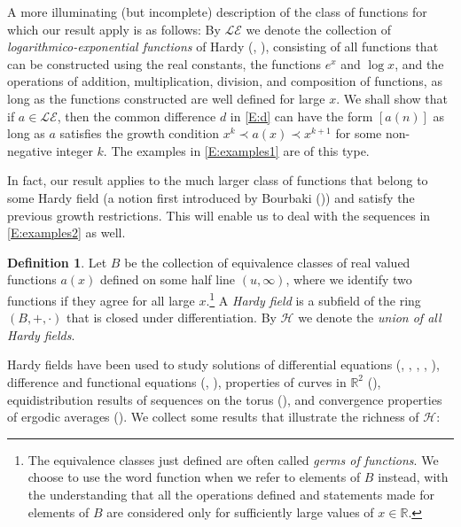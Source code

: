 \documentclass[11pt]{amsart}
\newcommand{\LE}{\mathcal{LE}}
\renewcommand{\H}{\mathcal{H}}
\newcommand{\R}{\mathbb{R}}
\theoremstyle{plain}
\theoremstyle{definition}
\newtheorem{definition}[theorem]{Definition}
\theoremstyle{remark}
\begin{document}


A more illuminating (but incomplete) description of the class of
functions for which our result apply is as follows: By $\LE$ we denote
the collection of \emph{logarithmico-exponential functions} of Hardy
(\cite{Ha1}, \cite{Ha2}), consisting of all functions that can be
constructed using the real constants, the functions $e^x$ and
$\log{x}$, and the operations of addition, multiplication, division,
and composition of functions, as long as the functions constructed are
well defined for large $x$.  We shall show that if $a\in \LE$, then the
common difference $d$ in \eqref{E:d} can have the form $[a(n)]$  as long as $a$ satisfies
the growth condition $x^k
\prec a(x) \prec x^{k+1}$ for some non-negative integer $k$. The
examples in \eqref{E:examples1} are of this type.

In fact, our result applies to the much larger class of functions that
belong to some Hardy field (a notion first introduced by Bourbaki
(\cite{Bou})) and satisfy the previous growth restrictions. This will
enable us to deal with the sequences in \eqref{E:examples2} as well.
\begin{definition}
  Let $B$ be the collection of equivalence classes of real valued
  functions $a(x)$ defined on some half line $(u,\infty)$, where we
  identify two functions if they agree for all large $x$.\footnote{The
    equivalence classes just defined are often called \emph{germs of
      functions}. We choose to use the word function when we refer to
    elements of $B$ instead, with the understanding that all the
    operations defined and statements made for elements of $B$ are
    considered only for sufficiently large values of $x\in \R$.}  A
  \emph{Hardy field} is a subfield of the ring $(B,+,\cdot)$ that is
  closed under differentiation. By $\H$ we denote the \emph{union of all
  Hardy fields}.
\end{definition}
Hardy fields have been used to study solutions of differential
equations (\cite{Bo1}, \cite{Bo2}, \cite{Bo2c}, \cite{R1}, \cite{R2}),
difference and functional equations (\cite{Bo2a}, \cite{Bo2b}),
properties of curves in $\R^2$ (\cite{Dr}), equidistribution results
of sequences on the torus (\cite{Bo3}), and convergence properties of ergodic averages
 (\cite{BKQW}).  We
collect some results that illustrate the richness of $\H$:
\end{document}
